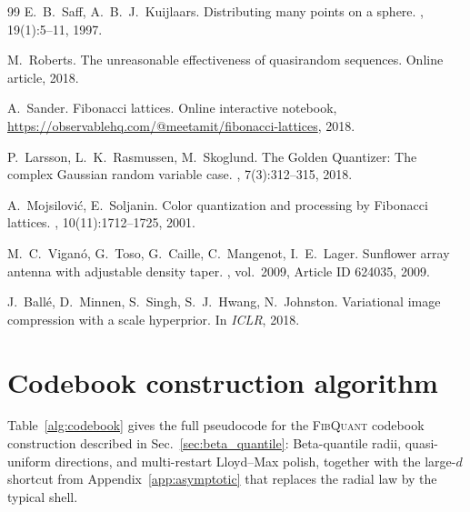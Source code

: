 \documentclass{article}
\theoremstyle{definition}
\theoremstyle{remark}
\begin{document}
{\begin{thebibliography}{99}
E.~B.~Saff, A.~B.~J.~Kuijlaars.
\newblock Distributing many points on a sphere.
, 19(1):5--11, 1997.

M.~Roberts.
\newblock The unreasonable effectiveness of quasirandom sequences.
Online article, 2018.

A.~Sander.
\newblock Fibonacci lattices.
\newblock Online interactive notebook,
\url{https://observablehq.com/@meetamit/fibonacci-lattices}, 2018.

P.~Larsson, L.~K.~Rasmussen, M.~Skoglund.
\newblock The Golden Quantizer: The complex Gaussian random variable
case.
, 7(3):312--315,
2018.

A.~Mojsilovi\'c, E.~Soljanin.
\newblock Color quantization and processing by Fibonacci lattices.
, 10(11):1712--1725, 2001.

M.~C.~Vigan\'o, G.~Toso, G.~Caille, C.~Mangenot, I.~E.~Lager.
\newblock Sunflower array antenna with adjustable density taper.
,
vol.~2009, Article ID 624035, 2009.

J.~Ball\'e, D.~Minnen, S.~Singh, S.~J.~Hwang, N.~Johnston.
\newblock Variational image compression with a scale hyperprior.
\newblock In {\em ICLR}, 2018.

\end{thebibliography}
}

\appendix

\section{Codebook construction algorithm}
\label{app:algorithm}

Table~\ref{alg:codebook} gives the full pseudocode for the
\textsc{FibQuant} codebook construction described in
Sec.~\ref{sec:beta_quantile}: Beta-quantile radii, quasi-uniform
directions, and multi-restart Lloyd--Max polish, together with the
large-$d$ shortcut from Appendix~\ref{app:asymptotic} that replaces
the radial law by the typical shell.
\end{document}
